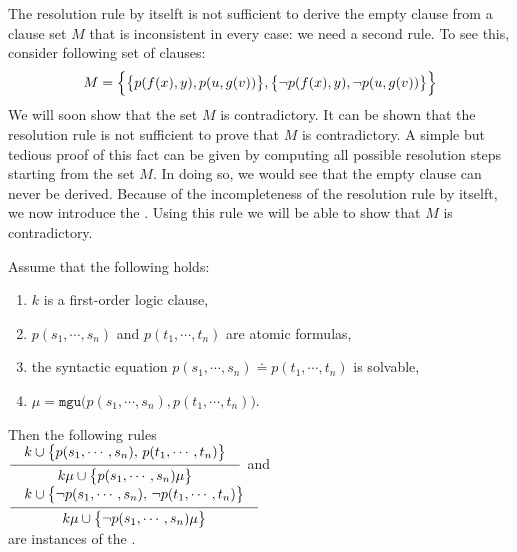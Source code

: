 The resolution rule by itselft is not sufficient to derive the empty clause from a clause set $M$ that is
inconsistent in every case: we need a second rule. To see this, consider following set of clauses:
\[ M = \Bigl\{ \bigl\{p(f(x),y), p(u,g(v))\bigr\}, 
               \bigl\{\neg p(f(x),y), \neg p(u,g(v))\bigr\} \Bigr\} 
\]
We will soon show that the set $M$ is contradictory. It can be shown that the resolution rule is not
sufficient to prove that $M$ is contradictory.
A simple but tedious proof of this fact can be given by computing all
possible resolution steps starting from the set $M$.  In doing so, we would see that the empty clause can never
be derived.  Because of the incompleteness of the resolution rule by itselft, we now introduce the
.  Using this rule we will be able to show that $M$ is contradictory. 

\begin{Definition} 
  Assume that the following holds:
  \begin{enumerate}
  \item $k$ is a first-order logic clause,
  \item $p(s_1,\cdots,s_n)$ and $p(t_1,\cdots,t_n)$ are atomic formulas,
  \item the syntactic equation $p(s_1,\cdots,s_n) \doteq p(t_1,\cdots,t_n)$ is solvable,
  \item $\mu = \mathtt{mgu}\bigl(p(s_1,\cdots,s_n), p(t_1,\cdots,t_n)\bigr)$.
  \end{enumerate}
  Then the following rules \\[0.3cm]
  \hspace*{0.8cm}
  $\schluss{k \cup \bigl\{p(s_1,\cdots,s_n),\, p(t_1,\cdots,t_n)\bigl\}}{k\mu \cup \bigl\{p(s_1,\cdots,s_n)\mu\bigr\} }$ 
  \quad and \quad
  $\schluss{k \cup \bigl\{ \neg p(s_1,\cdots,s_n),\, \neg p(t_1,\cdots,t_n)\bigl\}}{k\mu \cup \bigl\{\neg p(s_1,\cdots,s_n)\mu\bigr\} }$ 
  \\[0.3cm]
  are instances of the .
  \eox
\end{Definition}

